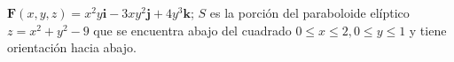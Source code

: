 \item $\mathbf{F}(x,y,z) = x^2y\mathbf{i} - 3xy^2\mathbf{j} + 4y^3\mathbf{k}$; $S$ es la porción del paraboloide elíptico $z = x^2 + y^2 - 9$ que se encuentra abajo del cuadrado $0 \le x \le 2, 0 \le y \le 1$ y tiene orientación hacia abajo.
